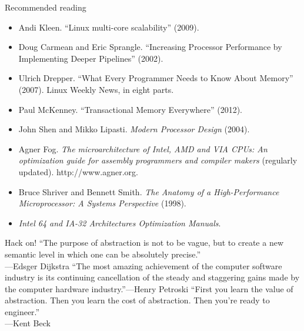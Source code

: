 \documentclass[mathserif,xcolor={dvipsnames,table}]{beamer}
\begin{document}
\begin{frame}{Recommended reading}
\footnotesize{
\begin{itemize}
\item Andi Kleen. ``Linux multi-core scalability'' (2009).
\item Doug Carmean and Eric Sprangle. ``Increasing Processor Performance by Implementing Deeper Pipelines'' (2002).
\item Ulrich Drepper. ``What Every Programmer Needs to Know About Memory'' (2007). Linux Weekly News, in eight parts.
\item Paul McKenney. ``Transactional Memory Everywhere'' (2012).
\item John Shen and Mikko Lipasti. \textit{Modern Processor Design} (2004).
\item Agner Fog. \textit{The microarchitecture of Intel, AMD and VIA CPUs: An optimization guide for assembly programmers and compiler makers} (regularly updated). http://www.agner.org.
\item Bruce Shriver and Bennett Smith. \textit{The Anatomy of a High-Performance Microprocessor: A Systems Perspective} (1998).
\item \textit{Intel 64 and IA-32 Architectures Optimization Manuals}.
\end{itemize}
}
\end{frame}

\begin{frame}{Hack on!}
``The purpose of abstraction is not to be vague, but to create a new semantic level in which one can be absolutely precise.''\\
\hfill---Edsger Dijkstra
\vfill
``The most amazing achievement of the computer software industry is its 
continuing cancellation of the steady and staggering gains made by the 
computer hardware industry.''\hfill---Henry Petroski
\vfill
\vfill
``First you learn the value of abstraction. Then you learn the cost of abstraction. Then you're ready to engineer.''\\
\hfill---Kent Beck
\end{frame}
\end{document}

